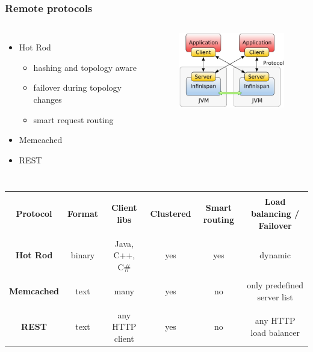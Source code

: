 \documentclass[10pt,utf8]{beamer}
\begin{document}
\begin{frame}
	\frametitle{Remote protocols}
	\begin{columns}
		\begin{itemize}
			\item Hot Rod
				\begin{itemize}
					\item hashing and topology aware
					\item failover during topology changes
					\item smart request routing
				\end{itemize}
			\item Memcached
			\item REST
		\end{itemize}
		\begin{figure}
			\includegraphics[width=5cm]{./img/ispn-cs.eps}
		\end{figure}
	\end{columns}
	
	 {
	\scriptsize{
	\begin{table}
		\begin{tabular}{|c||c|c|c|c|c|}
		\hline
			& & & & & \\
		\textbf{Protocol} & \textbf{Format} & \textbf{Client libs} & \textbf{Clustered} & \textbf{Smart routing} & \textbf{Load balancing / Failover} \\
		 \hline
			& & & & & \\
		 \textbf{Hot Rod} & binary & Java, C++, C\# & yes & yes & dynamic \\
			& & & & & \\
		 \textbf{Memcached} & text & many & yes & no & only predefined server list \\
			& & & & & \\
		 \textbf{REST} & text & any HTTP client & yes & no & any HTTP load balancer \\
		 \hline
		\end{tabular}
	\end{table}
	}
	}
\end{frame}
\end{document}
